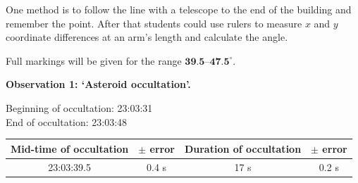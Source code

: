 One method is to follow the line with a telescope to the end of the building
and remember the point. After that students could use rulers to measure $x$
and $y$ coordinate differences at an arm's length and calculate the angle.

Full markings will be given for the range $\textbf{39.5--47.5}^\circ$.

\textbf{Observation 1: `Asteroid occultation'.}

Beginning of occultation: 23:03:31\\
End of occultation: 23:03:48

\begin{center}
\begin{tabular}{c|c|c|c}
Mid-time of occultation & $\pm$ error & Duration of occultation & $\pm$ error \\
\hline
23:03:39.5 & 0.4 s & 17 s & 0.2 s \\
\end{tabular}
\end{center}

